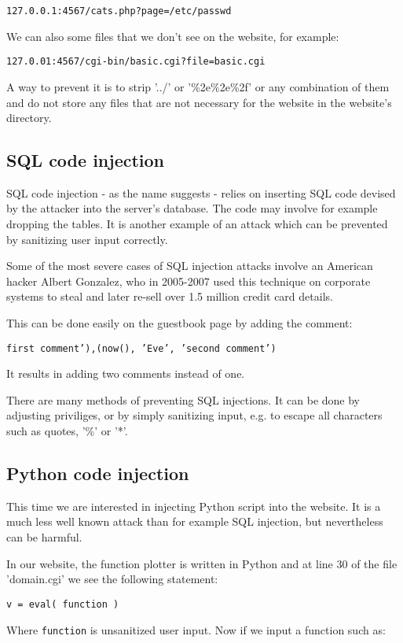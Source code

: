 \documentclass[11pt,journal]{article}
\begin{document}
	\texttt{127.0.0.1:4567/cats.php?page=/etc/passwd}
	
	We can also some files that we don't see on the website, for example:
	
	\texttt{127.0.01:4567/cgi-bin/basic.cgi?file=basic.cgi}
	
	A way to prevent it is to strip '../' or '\%2e\%2e\%2f' or any combination of them and do not store any files that are not necessary for the website in the website's directory.
	
	
	\subsection{SQL code injection}
	SQL code injection - as the name suggests - relies on inserting SQL code devised by the attacker into the server's database. The code may involve for example dropping the tables. It is another example of an attack which can be prevented by sanitizing user input correctly.
	
	Some of the most severe cases of SQL injection attacks involve an American hacker Albert Gonzalez, who in 2005-2007 used this technique on corporate systems to steal and later re-sell over 1.5 million credit card details\cite{Gonzalez}.
	
	This can be done easily on the guestbook page by adding the comment: 
	
	\texttt{first comment'),(now(), 'Eve', 'second comment')}
	
	It results in adding two comments instead of one.
	
	There are many methods of preventing SQL injections. It can be done by adjusting priviliges, or by simply sanitizing input, e.g. to escape all characters such as quotes, '\%' or '*'.
	
	
	\subsection{Python code injection}
	This time we are interested in injecting Python script into the website. It is a much less well known attack than for example SQL injection, but nevertheless can be harmful.\cite{Kevin London}
	
	In our website, the function plotter is written in Python and at line 30 of the file 'domain.cgi' we see the following statement:
	
	\texttt{v = eval( function )}
	
	Where \texttt{function} is unsanitized user input. Now if we input a function such as:
	
\end{document}

